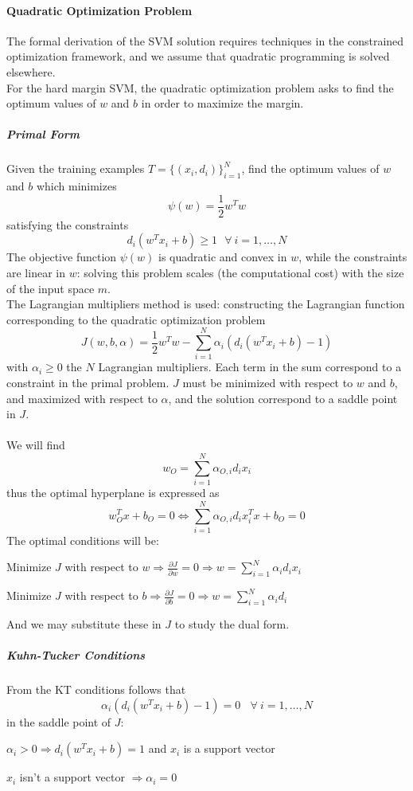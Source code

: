 \documentclass[10pt]{report}
\begin{document}
\paragraph{Quadratic Optimization Problem} The formal derivation of the SVM solution requires techniques in the constrained optimization framework, and we assume that quadratic programming is solved elsewhere.\\
For the hard margin SVM, the quadratic optimization problem asks to find the optimum values of $w$ and $b$ in order to maximize the margin.
\subparagraph{Primal Form} Given the training examples $T = \{(x_i, d_i)\}_{i=1}^N$, find the optimum values of $w$ and $b$ which minimizes $$\psi(w) = \frac{1}{2}w^Tw$$ satisfying the constraints $$d_i(w^Tx_i+b)\geq 1\:\:\:\forall\:i=1,\ldots,N$$
The objective function $\psi(w)$ is quadratic and convex in $w$, while the constraints are linear in $w$: solving this problem scales (the computational cost) with the size of the input space $m$.\\
The Lagrangian multipliers method is used: constructing the Lagrangian function corresponding to the quadratic optimization problem $$J(w, b,\alpha) = \frac{1}{2} w^Tw - \sum_{i=1}^N\alpha_i\left(d_i\left(w^Tx_i+b\right)-1\right)$$ with $\alpha_i \geq 0$ the $N$ Lagrangian multipliers. Each term in the sum correspond to a constraint in the primal problem. $J$ must be minimized with respect to $w$ and $b$, and maximized with respect to $\alpha$, and the solution correspond to a saddle point in $J$.\\\\
We will find $$w_O = \sum_{i=1}^N \alpha_{O,i}d_ix_i$$ thus the optimal hyperplane is expressed as $$w^T_Ox+b_O = 0 \Leftrightarrow \sum_{i=1}^N\alpha_{O,i}d_ix_i^Tx + b_O = 0$$
The optimal conditions will be:
\begin{list}{}{}
	\item Minimize $J$ with respect to $w \Rightarrow\frac{\partial J}{\partial w} = 0 \Rightarrow w = \sum_{i=1}^N \alpha_id_ix_i$
	\item Minimize $J$ with respect to $b \Rightarrow\frac{\partial J}{\partial b} = 0 \Rightarrow w = \sum_{i=1}^N \alpha_id_i$
\end{list}
And we may substitute these in $J$ to study the dual form.
\subparagraph{Kuhn-Tucker Conditions} From the KT conditions follows that $$\alpha_i(d_i(w^Tx_i + b) - 1) = 0\:\:\:\:\forall\:i=1,\ldots, N$$ in the saddle point of $J$:
\begin{list}{}{}
	\item $\alpha_i > 0 \Rightarrow d_i(w^Tx_i+b) = 1$ and $x_i$ is a support vector
	\item $x_i$ isn't a support vector $\Rightarrow \alpha_i = 0$
\end{list}
\end{document}
